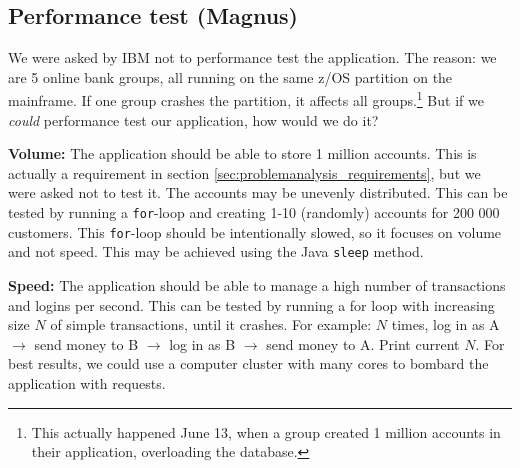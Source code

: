 \subsection{Performance test  (Magnus)}

We were asked by IBM not to performance test the application. The reason: we are 5 online bank groups, all running on the same z/OS partition on the mainframe. If one group crashes the partition, it affects all groups.\footnote{This actually happened June 13, when a group created 1 million accounts in their application, overloading the database.} But if we \textit{could} performance test our application, how would we do it? 

\textbf{Volume:} The application should be able to store 1 million accounts. This is actually a requirement in section \ref{sec:problemanalysis_requirements}, but we were asked not to test it. The accounts may be unevenly distributed. This can be tested by running a \texttt{for}-loop and creating 1-10 (randomly) accounts for 200 000 customers. This \texttt{for}-loop should be intentionally slowed, so it focuses on volume and not speed.  This may be achieved using the Java \texttt{sleep} method.

\textbf{Speed:}  The application should be able to manage a high number of transactions and logins per second. This can be tested by running a for loop with increasing size $N$ of simple transactions, until it crashes. 
For example: $N$ times, log in as A $\rightarrow$ send money to B $\rightarrow$ log in as B $\rightarrow$ send money to A. Print current $N$. For best results, we could use a computer cluster with many cores to bombard the application with requests.